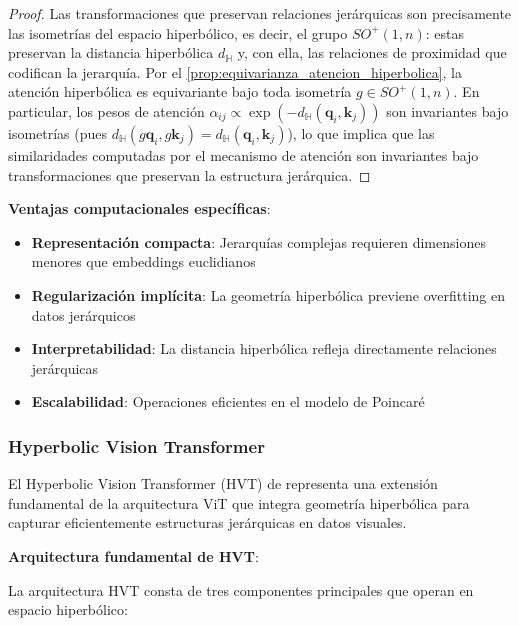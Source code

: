 \begin{proof}
Las transformaciones que preservan relaciones jerárquicas son precisamente las isometrías del espacio hiperbólico, es decir, el grupo $SO^+(1,n)$: estas preservan la distancia hiperbólica $d_{\mathbb{H}}$ y, con ella, las relaciones de proximidad que codifican la jerarquía. Por el \autoref{prop:equivarianza_atencion_hiperbolica}, la atención hiperbólica es equivariante bajo toda isometría $g \in SO^+(1,n)$. En particular, los pesos de atención $\alpha_{ij} \propto \exp(-d_{\mathbb{H}}(\mathbf{q}_i, \mathbf{k}_j))$ son invariantes bajo isometrías (pues $d_{\mathbb{H}}(g\mathbf{q}_i, g\mathbf{k}_j) = d_{\mathbb{H}}(\mathbf{q}_i, \mathbf{k}_j)$), lo que implica que las similaridades computadas por el mecanismo de atención son invariantes bajo transformaciones que preservan la estructura jerárquica.
\end{proof}

\textbf{Ventajas computacionales específicas}:

\begin{itemize}
    \item \textbf{Representación compacta}: Jerarquías complejas requieren dimensiones menores que embeddings euclidianos
    \item \textbf{Regularización implícita}: La geometría hiperbólica previene overfitting en datos jerárquicos
    \item \textbf{Interpretabilidad}: La distancia hiperbólica refleja directamente relaciones jerárquicas
    \item \textbf{Escalabilidad}: Operaciones eficientes en el modelo de Poincaré
\end{itemize}

\subsubsection{Hyperbolic Vision \gls{Transformer}}

El Hyperbolic Vision Transformer (HVT) de \citet{hvt2024hyperbolic} representa una extensión fundamental de la arquitectura \gls{ViT} que integra geometría hiperbólica para capturar eficientemente estructuras jerárquicas en datos visuales.

\textbf{Arquitectura fundamental de HVT}:

La arquitectura HVT consta de tres componentes principales que operan en espacio hiperbólico:

